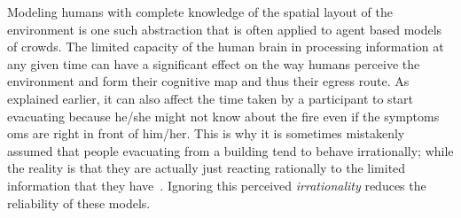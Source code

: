 
Modeling humans with complete knowledge of the spatial layout of the environment is one such abstraction that is often applied to agent based models of crowds. The limited capacity of the human brain in processing information at any given time can have a significant effect on the way humans perceive the environment and form their cognitive map and thus their egress route. As explained earlier, it can also affect the time taken by a participant to start evacuating because he/she might not know about the fire even if the symptoms
oms are right in front of him/her. This is why it is sometimes mistakenly assumed that people evacuating from a building tend to behave irrationally; while the reality is that they are actually just reacting rationally to the limited information that they have~\cite{Kobes:2009jx,Schadschneider:2008cz,Reicher:2008ep,Torres:2010tj,Paulsen:1984ti,Sime:1983uy}. Ignoring this perceived \emph{irrationality} reduces the reliability of these models.







